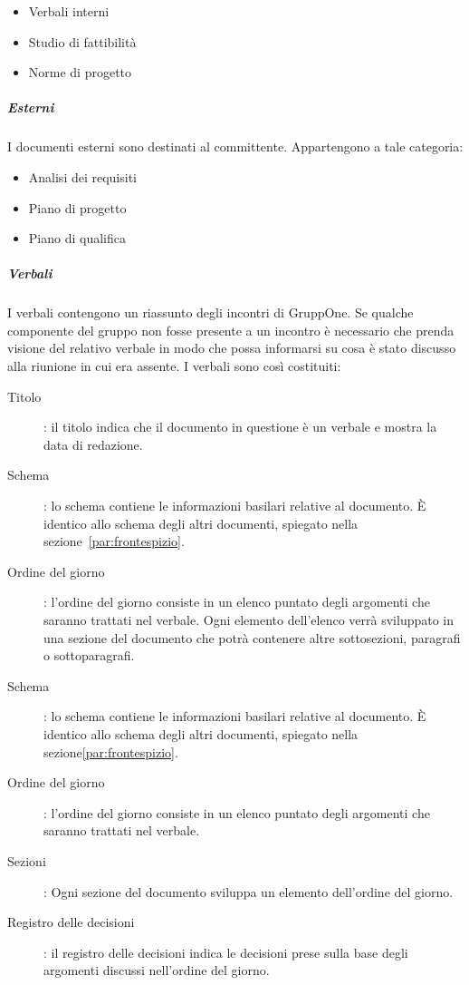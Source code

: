 \documentclass[../norme-di-progetto.tex]{subfiles}
\begin{document}
\begin{itemize}
  \item Verbali interni
  \item Studio di fattibilità
  \item Norme di progetto
\end{itemize}

\subparagraph{Esterni}%
\label{subp:suddivisione_dei_documenti/esterni}
I documenti esterni sono destinati al committente. Appartengono a tale categoria:

\begin{itemize}
  \item Analisi dei requisiti
  \item Piano di progetto
  \item Piano di qualifica
\end{itemize}

\subparagraph{Verbali}%
\label{subp:verbali}
I verbali contengono un riassunto degli incontri di GruppOne.
Se qualche componente del gruppo non fosse presente a un incontro è necessario che prenda visione del relativo verbale in modo che possa informarsi su cosa è stato discusso alla riunione in cui era assente.
I verbali sono così costituiti:

\begin{description}
  \item [Titolo]: il titolo indica che il documento in questione è un verbale e mostra la data di redazione.
  \item [Schema]: lo schema contiene le informazioni basilari relative al documento. È identico allo schema degli altri documenti, spiegato nella sezione~\ref{par:frontespizio}.
  \item [Ordine del giorno]: l'ordine del giorno consiste in un elenco puntato degli argomenti che saranno trattati nel verbale. Ogni elemento dell'elenco verrà sviluppato in una sezione del documento che potrà contenere altre sottosezioni, paragrafi o sottoparagrafi.
  \item [Schema]: lo schema contiene le informazioni basilari relative al documento. È identico allo schema degli altri documenti, spiegato nella sezione\ref{par:frontespizio}.
  \item [Ordine del giorno]: l'ordine del giorno consiste in un elenco puntato degli argomenti che saranno trattati nel verbale.
  \item [Sezioni]: Ogni sezione del documento sviluppa un elemento dell'ordine del giorno.
  \item [Registro delle decisioni]: il registro delle decisioni indica le decisioni prese sulla base degli argomenti discussi nell'ordine del giorno.
\end{description}
\end{document}
